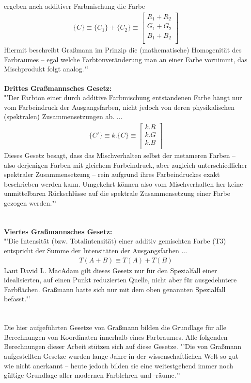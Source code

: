 \documentclass[11pt]{scrartcl}
\begin{document}
ergeben nach additiver Farbmischung die Farbe
\begin{align}\label{Equ:4}
    \{C\} \equiv \{C_1\} +\{C_2\} \equiv \left[ \begin{array}{r}
        R_1 + R_2 \\
        G_1 + G_2 \\
        B_1 + B_2 \\
    \end{array}\right]
\end{align}
Hiermit beschreibt Graßmann im Prinzip die (mathematische) Homogenität des Farbraumes – egal welche Farbtonveränderung man an einer Farbe
vornimmt, das Mischprodukt folgt analog."'\cite{wikipediaGrassmannGestze}\\
\\
\textbf{Drittes Graßmannsches Gesetz:}\\
"'Der Farbton einer durch additive Farbmischung entstandenen Farbe hängt nur vom Farbeindruck der Ausgangsfarben, nicht jedoch von deren
physikalischen (spektralen) Zusammensetzungen ab. ...
\begin{align}\label{Equ:5}
    \{C'\} \equiv k.\{C\} \equiv \left[ \begin{array}{r}
        k.R \\
        k.G \\
        k.B \\
    \end{array}\right]
\end{align}
Dieses Gesetz besagt, dass das Mischverhalten selbst der metameren Farben – also derjenigen Farben mit gleichem Farbeindruck, aber
zugleich unterschiedlicher spektraler Zusammensetzung – rein aufgrund ihres Farbeindruckes exakt beschrieben werden kann. Umgekehrt können
also vom Mischverhalten her keine unmittelbaren Rückschlüsse auf die spektrale Zusammensetzung einer Farbe gezogen werden."'\\
\cite{wikipediaGrassmannGestze}\\
\\
\textbf{Viertes Graßmannsches Gesetz:}\\
"'Die Intensität (bzw. Totalintensität) einer additiv gemischten Farbe (T3) entspricht der Summe der Intensitäten der Ausgangsfarben ...
\begin{align}\label{Equ:6}
    T(A+B) \equiv T(A) + T(B)
\end{align}
Laut David L. MacAdam gilt dieses Gesetz nur für den Spezialfall einer idealisierten, auf einen Punkt reduzierten Quelle, nicht aber für
ausgedehntere Farbflächen. Graßmann hatte sich nur mit dem oben genannten Spezialfall befasst."'\\
\cite{wikipediaGrassmannGestze}\\
\\
Die hier aufgeführten Gesetze von Graßmann bilden die Grundlage für alle Berechnungen von Koordinaten innerhalb eines Farbraumes. Alle folgenden
Berechnungen dieser Arbeit stützen sich auf diese Gesetze. "'Die von Graßmann aufgestellten Gesetze wurden lange Jahre in der
wissenschaftlichen Welt so gut wie nicht anerkannt – heute jedoch bilden sie eine weitestgehend immer noch gültige Grundlage aller modernen
Farblehren und -räume."' \cite{wikipediaGrassmannGestze}
\end{document}
